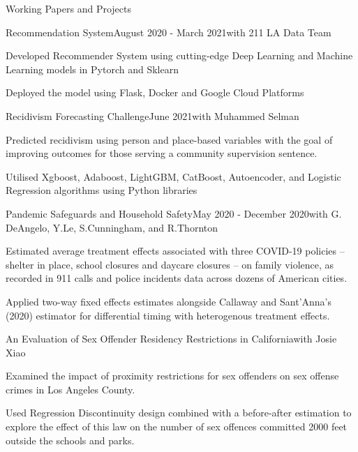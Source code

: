 \documentclass{resume} %
\begin{document}
\begin{rSection}{Working Papers and Projects}
\begin{rSubsection}{Recommendation System}{August 2020 - March 2021}{with 211 LA Data Team}{}
\item Developed Recommender System using cutting-edge Deep Learning and Machine Learning models in Pytorch and Sklearn 
\item Deployed the model using Flask, Docker and Google Cloud Platforms
\end{rSubsection}
\begin{rSubsection}{Recidivism Forecasting Challenge}{June 2021}{with Muhammed Selman}{}
\item Predicted recidivism using person and place-based variables with the goal of improving outcomes for those serving a community supervision sentence.
\item Utilised Xgboost, Adaboost, LightGBM, CatBoost, Autoencoder, and Logistic Regression algorithms using Python libraries 
\end{rSubsection}
\newpage 
\begin{rSubsection}{Pandemic Safeguards and Household Safety}{May 2020 - December 2020}{with G. DeAngelo, Y.Le, S.Cunningham, and R.Thornton}{}
\item Estimated average treatment effects associated with three COVID-19 policies – shelter in place, school closures and daycare closures – on family violence, as recorded in 911 calls and police incidents data across dozens of American cities.
\item Applied two-way fixed effects estimates alongside Callaway and Sant’Anna’s (2020) estimator for differential timing with heterogenous treatment effects.

\end{rSubsection}



\begin{rSubsection}{An Evaluation of Sex Offender Residency Restrictions in California}{}{with Josie Xiao}{}
\item Examined the impact of proximity restrictions for sex offenders on sex offense crimes in Los Angeles County.
\item Used Regression Discontinuity design combined with a before-after estimation to explore the effect of this law on the number of sex offences committed 2000 feet outside the schools and parks.
\end{rSubsection}
\iffalse
\begin{rSubsection}{Covid project}{December 2016}{}{}
\item Estimate average treatment effects associated with three COVID-19 policies – shelter in place, school closures and daycare closures – on family violence, as recorded in 911 calls and police incidents data across dozens of American cities.
\item present two-way fixed effects estimates alongside Callaway and Sant’Anna’s (2020) estimator for differential timing with heterogenous treatment effects.
Is able to solve 3x3 tile board in less than 1 second using the A* algorithm
\end{rSubsection}
\fi
\end{rSection}
\end{document}

